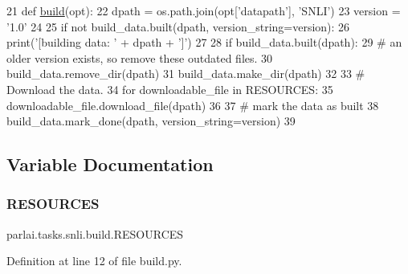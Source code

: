\begin{DoxyCode}
21 \textcolor{keyword}{def }\hyperlink{namespacedialog__babi__feedback_1_1build_a7a9d289f7493a5ded13c4b7f071b6184}{build}(opt):
22     dpath = os.path.join(opt[\textcolor{stringliteral}{'datapath'}], \textcolor{stringliteral}{'SNLI'})
23     version = \textcolor{stringliteral}{'1.0'}
24 
25     \textcolor{keywordflow}{if} \textcolor{keywordflow}{not} build\_data.built(dpath, version\_string=version):
26         print(\textcolor{stringliteral}{'[building data: '} + dpath + \textcolor{stringliteral}{']'})
27 
28         \textcolor{keywordflow}{if} build\_data.built(dpath):
29             \textcolor{comment}{# an older version exists, so remove these outdated files.}
30             build\_data.remove\_dir(dpath)
31         build\_data.make\_dir(dpath)
32 
33         \textcolor{comment}{# Download the data.}
34         \textcolor{keywordflow}{for} downloadable\_file \textcolor{keywordflow}{in} RESOURCES:
35             downloadable\_file.download\_file(dpath)
36 
37         \textcolor{comment}{# mark the data as built}
38         build\_data.mark\_done(dpath, version\_string=version)
39 \end{DoxyCode}


\subsection{Variable Documentation}
\mbox{\label{namespaceparlai_1_1tasks_1_1snli_1_1build_ae6b4372d4e627c59cb67c273f5dabca7}} 
\subsubsection{\texorpdfstring{R\+E\+S\+O\+U\+R\+C\+ES}{RESOURCES}}
{\footnotesize\ttfamily parlai.\+tasks.\+snli.\+build.\+R\+E\+S\+O\+U\+R\+C\+ES}



Definition at line 12 of file build.\+py.

